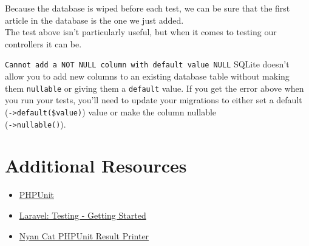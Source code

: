 Because the database is wiped before each test, we can be sure that the first article in the database is the one we just added.
\\

The test above isn't particularly useful, but when it comes to testing our controllers it can be.

\begin{infobox}{\texttt{Cannot add a NOT NULL column with default value NULL}}
    SQLite doesn't allow you to add new columns to an existing database table without making them \texttt{nullable} or giving them a \texttt{default} value. If you get the error above when you run your tests, you'll need to update your migrations to either set a default (\texttt{->default(\$value)}) value or make the column nullable \\ (\texttt{->nullable()}).
\end{infobox}



\section{Additional Resources}

\begin{itemize}[leftmargin=*]
    \item \href{https://github.com/sebastianbergmann/phpunit}{PHPUnit}
    \item \href{http://laravel.com/docs/6.x/testing}{Laravel: Testing - Getting Started}
    \item \href{https://github.com/JeroenDeDauw/nyancat-phpunit-resultprinter}{Nyan Cat PHPUnit Result Printer}
\end{itemize}
